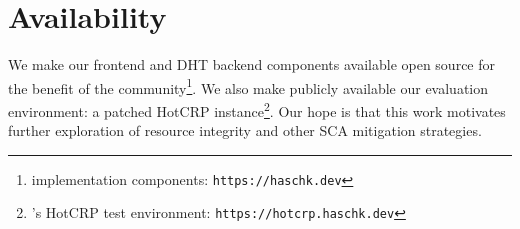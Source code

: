 \section{Availability} \label{sec:availability}

We make our \SYSTEM{} frontend and DHT backend components available open source
for the benefit of the community\footnote{\SYSTEM{} implementation components:
\texttt{https://haschk.dev}}. We also make publicly available our evaluation
environment: a patched HotCRP instance\footnote{\SYSTEM{}'s HotCRP test
environment: \texttt{https://hotcrp.haschk.dev}}. Our hope is that this work
motivates further exploration of resource integrity and other SCA mitigation
strategies.
